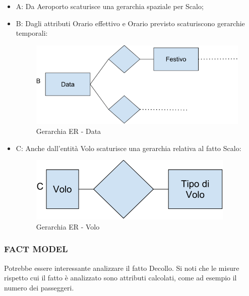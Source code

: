 \begin{itemize}

\item{A}: Da Aeroporto scaturisce una gerarchia spaziale per Scalo;
\item{B}: Dagli attributi Orario effettivo e Orario previsto scaturiscono gerarchie temporali:

\begin{center}
\begin{figure}[H]
\centering
\includegraphics[scale=1]{figures/data.png}
\caption{Gerarchia ER - Data}
\end{figure}
\end{center}

\item{C}: Anche dall’entità Volo scaturisce una gerarchia relativa al fatto Scalo:

\begin{center}
\begin{figure}[H]
\centering
\includegraphics[scale=1]{figures/volo.png}
\caption{Gerarchia ER - Volo}
\end{figure}
\end{center}

\end{itemize}


\subsubsection{FACT MODEL}

Potrebbe essere interessante analizzare il fatto Decollo. Si noti che le misure rispetto cui il fatto è analizzato sono attributi calcolati, come ad esempio il numero dei passeggeri. 

